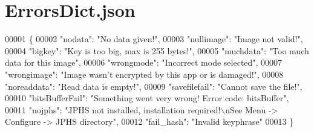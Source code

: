 \hypertarget{_errors_dict_8json_source}{}\section{Errors\+Dict.\+json}
\label{_errors_dict_8json_source}

\begin{DoxyCode}
00001 \{
00002     "nodata": "No data given!",
00003     "nullimage": "Image not valid!",
00004     "bigkey": "Key is too big, max is 255 bytes!",
00005     "muchdata": "Too much data for this image",
00006     "wrongmode": "Incorrect mode selected",
00007     "wrongimage": "Image wasn't encrypted by this app or is damaged!",
00008     "noreaddata": "Read data is empty!",
00009     "savefilefail": "Cannot save the file!",
00010     "bitsBufferFail": "Something went very wrong! Error code: bitsBuffer",
00011     "nojphs": "JPHS not installed, installation required!\(\backslash\)nSee Menu -> Configure -> JPHS directory",
00012     "fail\_hash": "Invalid keyphrase"
00013 \}
\end{DoxyCode}

